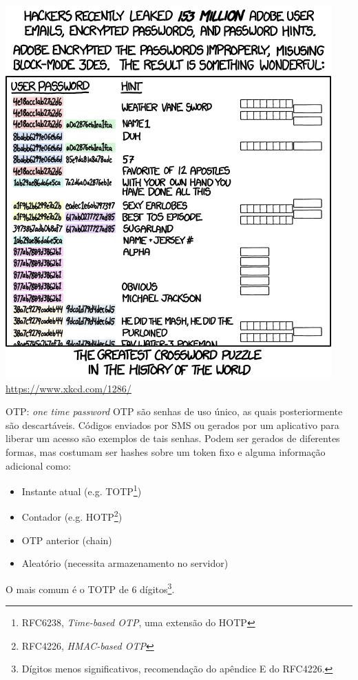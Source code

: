 \documentclass[utf8]{beamer}
\begin{document}
\begin{frame}
  \centering
  \includegraphics[width=.7\textwidth]{encryptic.png}
  \url{https://www.xkcd.com/1286/}
\end{frame}


\begin{frame}{OTP: \emph{one time password}}
  OTP são senhas de uso único,
  as quais posteriormente são descartáveis.
  Códigos enviados por SMS ou gerados por um aplicativo
  para liberar um acesso são exemplos de tais senhas.
  \vfill
  Podem ser gerados de diferentes formas,
  mas costumam ser hashes sobre um token fixo e alguma
  informação adicional como:
  \begin{itemize}
    \item Instante atual (e.g. TOTP\footnote{
      RFC6238, \emph{Time-based OTP}, uma extensão do HOTP
    })
    \item Contador (e.g. HOTP\footnote{
      RFC4226, \emph{HMAC-based OTP}
    })
    \item OTP anterior (chain)
    \item Aleatório (necessita armazenamento no servidor)
  \end{itemize}
  \vfill
  O mais comum é o TOTP de 6 dígitos\footnote{
    Dígitos menos significativos,
    recomendação do apêndice E do RFC4226.
  }.
\end{frame}
\end{document}
